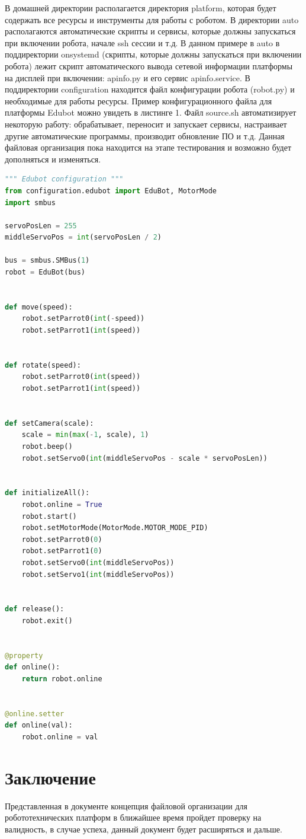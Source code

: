 \documentclass[a4paper,12pt]{article}
\begin{document}
В домашней директории располагается директория platform, которая будет содержать все ресурсы и инструменты для работы с роботом. В директории auto располагаются автоматические скрипты и сервисы, которые должны запускаться при включении робота, начале ssh сессии и т.д. В данном примере в auto в поддиректории onsystemd (скрипты, которые должны запускаться при включении робота) лежит скрипт автоматического вывода сетевой информации платформы на дисплей при включении: apinfo.py и его сервис apinfo.service. В поддиректории configuration находится файл конфигурации робота (robot.py) и необходимые для работы ресурсы. Пример конфигурационного файла для платформы Edubot можно увидеть в листинге 1. Файл source.sh автоматизирует некоторую работу: обрабатывает, переносит и запускает сервисы, настраивает другие автоматические программы, производит обновление ПО и т.д. Данная файловая организация пока находится на этапе тестирования и возможно будет дополняться и изменяться. 

\begin{lstlisting}[language=Python, caption=Конфигурационный файл платформы Edubot robot.py]
""" Edubot configuration """
from configuration.edubot import EduBot, MotorMode
import smbus

servoPosLen = 255
middleServoPos = int(servoPosLen / 2)

bus = smbus.SMBus(1)
robot = EduBot(bus)


def move(speed):
    robot.setParrot0(int(-speed))
    robot.setParrot1(int(speed))


def rotate(speed):
    robot.setParrot0(int(speed))
    robot.setParrot1(int(speed))


def setCamera(scale):
    scale = min(max(-1, scale), 1)
    robot.beep()
    robot.setServo0(int(middleServoPos - scale * servoPosLen))


def initializeAll():
    robot.online = True
    robot.start()
    robot.setMotorMode(MotorMode.MOTOR_MODE_PID)
    robot.setParrot0(0)
    robot.setParrot1(0)
    robot.setServo0(int(middleServoPos))
    robot.setServo1(int(middleServoPos))


def release():
    robot.exit()


@property
def online():
    return robot.online


@online.setter
def online(val):
    robot.online = val
\end{lstlisting}

\section{Заключение}
Представленная в документе концепция файловой организации для робототехнических платформ в ближайшее время пройдет проверку на валидность, в случае успеха, данный документ будет расширяться и дальше.  
\end{document}
